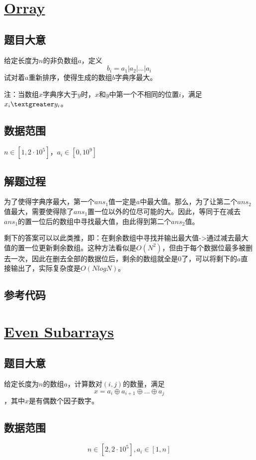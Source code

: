 \documentclass[UTF8]{ctexart}
\begin{document}
	
	\section{\href{https://codeforces.com/problemset/problem/1742/G}{Orray}}
	\subsection{题目大意}
	给定长度为$n$的非负数组$a$，定义
	$$b_i=a_1|a_2|...|a_i$$
	试对着$a$重新排序，使得生成的数组$b$字典序最大。
	
	注：当数组$x$字典序大于$y$时，$x$和$y$中第一个不相同的位置$i$，满足$x_i\textgreater y_i$。
	\subsection{数据范围}
	$n\in [1,2\cdot 10^5]$，$a_i\in [0,10^9]$
	\subsection{解题过程}
	为了使得字典序最大，第一个$ans_1$值一定是$a$中最大值。那么，为了让第二个$ans_2$值最大，需要使得除了$ans_1$置一位以外的位尽可能的大。因此，等同于在减去$ans_1$的置一位后的数组中寻找最大值，由此得到第二个$ans_2$值。
	
	剩下的答案可以以此类推，即：在剩余数组中寻找并输出最大值->通过减去最大值的置一位更新剩余数组。这种方法看似是$O(N^2)$，但由于每个数据位最多被删去一次，因此在删去全部的数据位后，剩余的数组就全是0了，可以将剩下的$a$直接输出了，实际复杂度是$O(NlogN)$。
	
	\subsection{参考代码}
	
	
	\section{\href{https://codeforces.com/problemset/problem/1731/C}{Even Subarrays}}
	\subsection{题目大意}
	给定长度为$n$的数组$a$，计算数对$(i,j)$的数量，满足
	$$x=a_i\oplus a_{i+1}\oplus ...\oplus a_j$$，其中$x$是有偶数个因子数字。
	\subsection{数据范围}
	$$n\in [2,2\cdot10^5],a_i\in [1,n]$$
\end{document}
